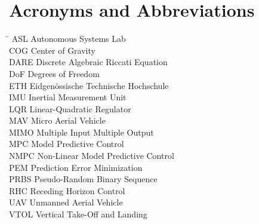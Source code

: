 \section*{Acronyms and Abbreviations}
\begin{tabbing}
 \hspace*{1.6cm}  \= \kill
 ASL \> Autonomous Systems Lab \\[0.5ex]
 COG \> Center of Gravity \\[0.5ex]
 DARE \> Discrete Algebraic Riccati Equation \\[0.5ex]
 DoF \> Degrees of Freedom \\[0.5ex]
 ETH \> Eidgenössische Technische Hochschule \\[0.5ex]
 IMU \> Inertial Measurement Unit \\[0.5ex]
 LQR \> Linear-Quadratic Regulator \\[0.5ex]
 MAV \> Micro Aerial Vehicle \\[0.5ex]
 MIMO \> Multiple Input Multiple Output \\[0.5ex]
 MPC \> Model Predictive Control \\[0.5ex]
 NMPC \> Non-Linear Model Predictive Control \\[0.5ex]
 PEM \> Prediction Error Minimization \\[0.5ex]
 PRBS \> Pseudo-Random Binary Sequence \\[0.5ex]
 RHC \> Receding Horizon Control \\[0.5ex]
 UAV \> Unmanned Aerial Vehicle \\[0.5ex]
 VTOL \> Vertical Take-Off and Landing \\[0.5ex]

\end{tabbing}